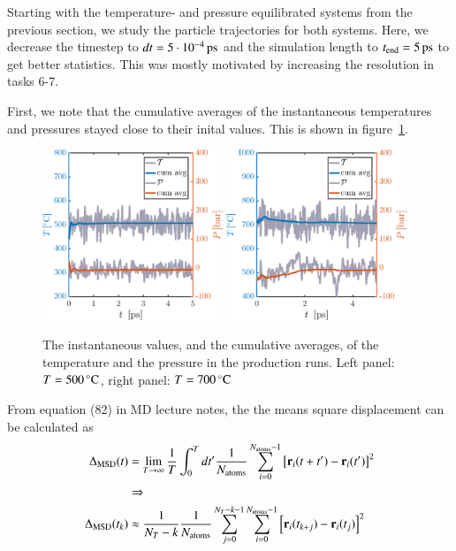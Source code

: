 Starting with the temperature- and pressure equilibrated systems from the previous section, we study the particle trajectories for both systems. Here, we decrease the timestep to   $dt       = \unit[5\cdot 10^{-4}]{ps}$ and the simulation length to $t_{\rm end} = \unit[5]{ps}$ to get better statistics. This was mostly motivated by increasing the resolution in tasks 6-7. 

First, we note that the cumulative averages of the instantaneous temperatures and pressures stayed close to their inital values. This is shown in figure~\ref{fig:prod}.
\begin{figure}[!ht]
\begin{center}
  \includegraphics[width=0.48\textwidth]{../figures/TP-prod-500} 
    \includegraphics[width=0.48\textwidth]{../figures/TP-prod-700} 
  \caption{The instantaneous values, and the cumulative averages, of the temperature and the pressure in the production runs. Left panel: $T=\unit[500]{^\circ C}$,  right panel: $T=\unit[700]{^\circ C}$}
  \label{fig:prod}
\end{center}
\end{figure}

From equation (82) in MD lecture notes, the the means square displacement can be calculated as
\begin{align}
\Delta_{\rm MSD}(t) &= \lim_{T \rightarrow \infty} \frac{1}{T} \int_0^{T} d t' \frac{1}{N_{\rm atoms}} \sum_{i=0}^{N_{\rm atoms}-1} \left[{\bf r}_i(t+t') - {\bf r}_i(t') \right]^2 \\ &\Rightarrow \nonumber
\\
\Delta_{\rm MSD}(t_k) &\approx
\frac{1}{N_T -k}\frac{1}{N_{\rm atoms}} \sum_{j=0}^{N_T-k-1} \sum_{i=0}^{N_{\rm atoms}-1} \left[{\bf r}_i(t_{k+j}) - {\bf r}_i(t_j) \right]^2 
\label{eq:1}
\end{align}




